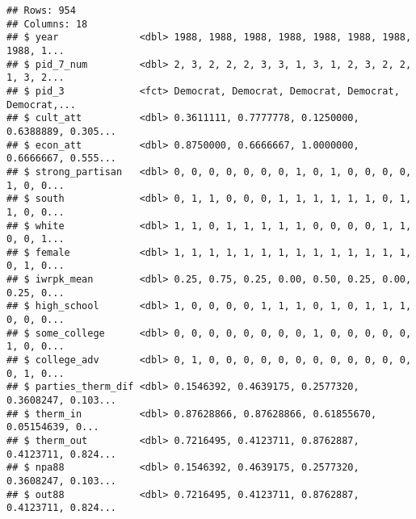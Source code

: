 \documentclass[
]{article}
\newenvironment{Shaded}{\begin{snugshade}}{\end{snugshade}}
\newcommand{\DecValTok}[1]{\textcolor[rgb]{0.00,0.00,0.81}{#1}}
\newcommand{\KeywordTok}[1]{\textcolor[rgb]{0.13,0.29,0.53}{\textbf{#1}}}
\newcommand{\NormalTok}[1]{#1}
\newcommand{\OperatorTok}[1]{\textcolor[rgb]{0.81,0.36,0.00}{\textbf{#1}}}
\newcommand{\StringTok}[1]{\textcolor[rgb]{0.31,0.60,0.02}{#1}}
\begin{document}
\begin{verbatim}
## Rows: 954
## Columns: 18
## $ year              <dbl> 1988, 1988, 1988, 1988, 1988, 1988, 1988, 1988, 1...
## $ pid_7_num         <dbl> 2, 3, 2, 2, 2, 3, 3, 1, 3, 1, 2, 3, 2, 2, 1, 3, 2...
## $ pid_3             <fct> Democrat, Democrat, Democrat, Democrat, Democrat,...
## $ cult_att          <dbl> 0.3611111, 0.7777778, 0.1250000, 0.6388889, 0.305...
## $ econ_att          <dbl> 0.8750000, 0.6666667, 1.0000000, 0.6666667, 0.555...
## $ strong_partisan   <dbl> 0, 0, 0, 0, 0, 0, 0, 1, 0, 1, 0, 0, 0, 0, 1, 0, 0...
## $ south             <dbl> 0, 1, 1, 0, 0, 0, 1, 1, 1, 1, 1, 1, 0, 1, 1, 0, 0...
## $ white             <dbl> 1, 1, 0, 1, 1, 1, 1, 1, 0, 0, 0, 0, 1, 1, 0, 0, 1...
## $ female            <dbl> 1, 1, 1, 1, 1, 1, 1, 1, 1, 1, 1, 1, 1, 1, 0, 1, 0...
## $ iwrpk_mean        <dbl> 0.25, 0.75, 0.25, 0.00, 0.50, 0.25, 0.00, 0.25, 0...
## $ high_school       <dbl> 1, 0, 0, 0, 0, 1, 1, 1, 0, 1, 0, 1, 1, 1, 0, 0, 0...
## $ some_college      <dbl> 0, 0, 0, 0, 0, 0, 0, 0, 1, 0, 0, 0, 0, 0, 1, 0, 0...
## $ college_adv       <dbl> 0, 1, 0, 0, 0, 0, 0, 0, 0, 0, 0, 0, 0, 0, 0, 1, 0...
## $ parties_therm_dif <dbl> 0.1546392, 0.4639175, 0.2577320, 0.3608247, 0.103...
## $ therm_in          <dbl> 0.87628866, 0.87628866, 0.61855670, 0.05154639, 0...
## $ therm_out         <dbl> 0.7216495, 0.4123711, 0.8762887, 0.4123711, 0.824...
## $ npa88             <dbl> 0.1546392, 0.4639175, 0.2577320, 0.3608247, 0.103...
## $ out88             <dbl> 0.7216495, 0.4123711, 0.8762887, 0.4123711, 0.824...
\end{verbatim}

\begin{Shaded}
\end{Shaded}
\end{document}
